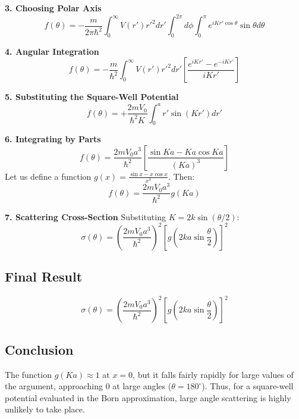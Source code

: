 \documentclass[12pt]{report}
\begin{document}
\textbf{3. Choosing Polar Axis}
\begin{equation}
f(\theta) = -\frac{m}{2\pi \hbar^2} \int_0^\infty V(r') r'^2 dr' \int_0^{2\pi} d\phi \int_0^\pi e^{iKr'\cos\theta} \sin\theta d\theta
\end{equation}

\textbf{4. Angular Integration}
\begin{equation}
f(\theta) = -\frac{m}{\hbar^2} \int_0^\infty V(r') r'^2 dr' \left[ \frac{e^{iKr'} - e^{-iKr'}}{iKr'} \right]
\end{equation}

\textbf{5. Substituting the Square-Well Potential}
\begin{equation}
f(\theta) = +\frac{2mV_0}{\hbar^2 K} \int_0^a r' \sin(Kr') dr'
\end{equation}

\textbf{6. Integrating by Parts}
\begin{equation}
f(\theta) = \frac{2mV_0 a^3}{\hbar^2} \left[ \frac{\sin Ka - Ka \cos Ka}{(Ka)^3} \right]
\end{equation}
Let us define a function $g(x) = \frac{\sin x - x \cos x}{x^3}$. Then:
\begin{equation}
f(\theta) = \frac{2mV_0 a^3}{\hbar^2} g(Ka)
\end{equation}

\textbf{7. Scattering Cross-Section} Substituting $K = 2k \sin(\theta/2)$:
\begin{equation}
\sigma(\theta) = \left( \frac{2mV_0 a^3}{\hbar^2} \right)^2 \left[ g\left(2ka \sin \frac{\theta}{2}\right) \right]^2
\end{equation}

\subsection*{Final Result}
\begin{equation}
\boxed{ \sigma(\theta) = \left( \frac{2mV_0 a^3}{\hbar^2} \right)^2 \left[ g\left( 2ka \sin \frac{\theta}{2} \right) \right]^2 }
\end{equation}

\subsection*{Conclusion}
The function $g(Ka) \approx 1$ at $x=0$, but it falls fairly rapidly for large values of the argument, approaching $0$ at large angles ($\theta = 180^\circ$). Thus, for a square-well potential evaluated in the Born approximation, large angle scattering is highly unlikely to take place.
\end{document}
